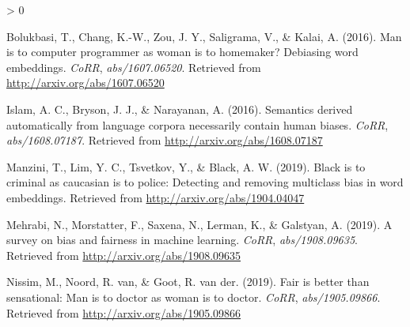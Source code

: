 \documentclass[
  12pt,
]{book}
\newlength{\cslhangindent}
\newenvironment{CSLReferences}[2] %
 {%
  \setlength{\parindent}{0pt}
  \ifodd #1 \everypar{\setlength{\hangindent}{\cslhangindent}}\ignorespaces\fi
  \ifnum #2 > 0
  \setlength{\parskip}{#2\baselineskip}
  \fi
 }%
 {}
\begin{document}
\hypertarget{refs}{}
\begin{CSLReferences}{1}{0}
\leavevmode\hypertarget{ref-Bolukbasi2016Man}{}%
Bolukbasi, T., Chang, K.-W., Zou, J. Y., Saligrama, V., \& Kalai, A. (2016). Man is to computer programmer as woman is to homemaker? Debiasing word embeddings. \emph{CoRR}, \emph{abs/1607.06520}. Retrieved from \url{http://arxiv.org/abs/1607.06520}

\leavevmode\hypertarget{ref-Caliskan2017Semantics}{}%
Islam, A. C., Bryson, J. J., \& Narayanan, A. (2016). Semantics derived automatically from language corpora necessarily contain human biases. \emph{CoRR}, \emph{abs/1608.07187}. Retrieved from \url{http://arxiv.org/abs/1608.07187}

\leavevmode\hypertarget{ref-manzini2019black}{}%
Manzini, T., Lim, Y. C., Tsvetkov, Y., \& Black, A. W. (2019). Black is to criminal as caucasian is to police: Detecting and removing multiclass bias in word embeddings. Retrieved from \url{http://arxiv.org/abs/1904.04047}

\leavevmode\hypertarget{ref-Mehrabi2019Survey}{}%
Mehrabi, N., Morstatter, F., Saxena, N., Lerman, K., \& Galstyan, A. (2019). A survey on bias and fairness in machine learning. \emph{CoRR}, \emph{abs/1908.09635}. Retrieved from \url{http://arxiv.org/abs/1908.09635}

\leavevmode\hypertarget{ref-Nissim2019Fair}{}%
Nissim, M., Noord, R. van, \& Goot, R. van der. (2019). Fair is better than sensational: Man is to doctor as woman is to doctor. \emph{CoRR}, \emph{abs/1905.09866}. Retrieved from \url{http://arxiv.org/abs/1905.09866}

\end{CSLReferences}
\end{document}
